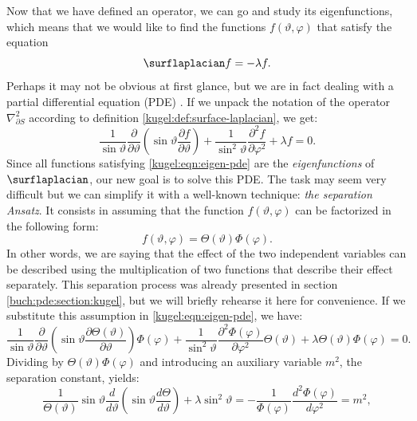 Now that we have defined an operator, we can go and study its eigenfunctions,
which means that we would like to find the functions $f(\vartheta, \varphi)$
that satisfy the equation
\begin{equation} \label{kugel:eqn:eigen}
    \surflaplacian f = -\lambda f.
\end{equation}
Perhaps it may not be obvious at first glance, but we are in fact dealing with a
partial differential equation (PDE) . If we
unpack the notation of the operator $\nabla^2_{\partial S}$ according to
definition
\ref{kugel:def:surface-laplacian}, we get:
\begin{equation} \label{kugel:eqn:eigen-pde}
    \frac{1}{\sin\vartheta} \frac{\partial}{\partial \vartheta} \left(
      \sin\vartheta \frac{\partial f}{\partial\vartheta}
    \right)
    + \frac{1}{\sin^2 \vartheta} \frac{\partial^2 f}{\partial\varphi^2}
    + \lambda f = 0.
\end{equation}
Since all functions satisfying \eqref{kugel:eqn:eigen-pde} are the
\emph{eigenfunctions} of $\surflaplacian$, our new goal is to solve this PDE.
The task may seem very difficult but we can simplify it with a well-known
technique: \emph{the separation Ansatz}. It consists in assuming that the
function $f(\vartheta, \varphi)$ can be factorized in the following form:
\begin{equation}
    f(\vartheta, \varphi) = \Theta(\vartheta)\Phi(\varphi). 
\end{equation}
In other words, we are saying that the effect of the two independent variables
can be described using the multiplication of two functions that describe their
effect separately. This separation process was already presented in section
\ref{buch:pde:section:kugel}, but we will briefly rehearse it here for
convenience. If we substitute this assumption in
\eqref{kugel:eqn:eigen-pde}, we have:
\begin{equation*}
    \frac{1}{\sin\vartheta} \frac{\partial}{\partial \vartheta} \left(
      \sin\vartheta \frac{\partial  \Theta(\vartheta)}{\partial\vartheta}
    \right) \Phi(\varphi)
    + \frac{1}{\sin^2 \vartheta}
      \frac{\partial^2 \Phi(\varphi)}{\partial\varphi^2}
      \Theta(\vartheta)
    + \lambda \Theta(\vartheta)\Phi(\varphi) = 0.
\end{equation*}
Dividing by $\Theta(\vartheta)\Phi(\varphi)$ and introducing an auxiliary
variable $m^2$, the separation constant, yields:
\begin{equation*}
  \frac{1}{\Theta(\vartheta)}\sin \vartheta \frac{d}{d \vartheta} \left(
    \sin \vartheta \frac{d \Theta}{d \vartheta}
  \right)
  + \lambda \sin^2 \vartheta
  = -\frac{1}{\Phi(\varphi)} \frac{d^2\Phi(\varphi)}{d\varphi^2}
  = m^2,
\end{equation*}
